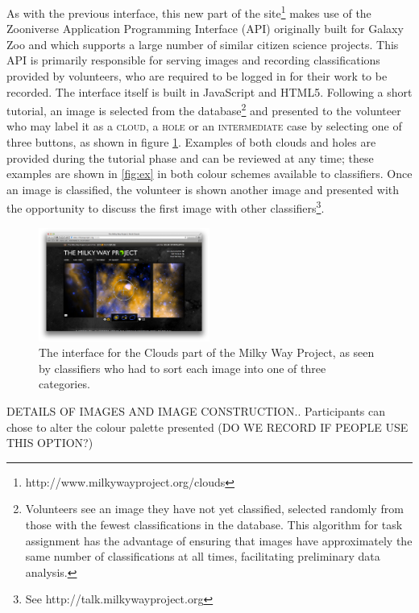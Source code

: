 \documentclass[a4,useAMS,usenatbib]{mn2e}
\begin{document}
As with the previous interface, this new part of the site\footnote{http://www.milkywayproject.org/clouds} makes use of the Zooniverse Application Programming Interface (API) originally built for Galaxy Zoo \citep{Lintottetal} and which supports a large number of similar citizen science projects. This API is primarily responsible for serving images and recording classifications provided by volunteers, who are required to be logged in for their work to be recorded. The interface itself is built in JavaScript and HTML5. Following a short tutorial, an image is selected from the database\footnote{Volunteers see an image they have not yet classified, selected randomly from those with the fewest classifications in the database. This algorithm for task assignment has the advantage of ensuring that images have approximately the same number of classifications at all times, facilitating preliminary data analysis.} and presented to the volunteer who may label it as a \textsc{cloud}, a \textsc{hole} or an \textsc{intermediate} case by selecting one of three buttons, as shown in figure \ref{fig:interface}. Examples of both clouds and holes are provided during the tutorial phase and can be reviewed at any time; these examples are shown in \ref{fig:ex} in both colour schemes available to classifiers. Once an image is classified, the volunteer is shown another image and presented with the opportunity to discuss the first image with other classifiers\footnote{See http://talk.milkywayproject.org}. 

\begin{figure}
\includegraphics[angle=0,width=0.5\textwidth]{Interface.png}
\caption{The interface for the Clouds part of the Milky Way Project, as seen by classifiers who had to sort each image into one of three categories.}\label{fig:interface}
\end{figure}

DETAILS OF IMAGES AND IMAGE CONSTRUCTION.. Participants can chose to alter the colour palette presented (DO WE RECORD IF PEOPLE USE THIS OPTION?)
\end{document}
